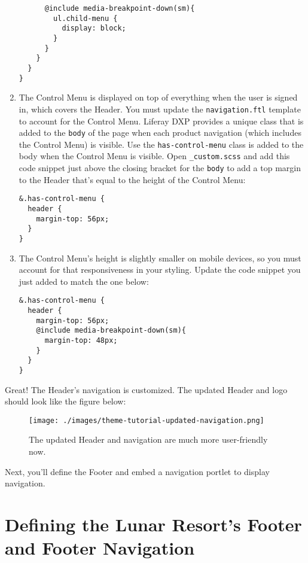 \begin{enumerate}
\begin{verbatim}
      @include media-breakpoint-down(sm){
        ul.child-menu {
          display: block;
        }
      }    
    }
  }
}
\end{verbatim}
\item
  The Control Menu is displayed on top of everything when the user is
  signed in, which covers the Header. You must update the
  \texttt{navigation.ftl} template to account for the Control Menu.
  Liferay DXP provides a unique class that is added to the \texttt{body}
  of the page when each product navigation (which includes the Control
  Menu) is visible. Use the \texttt{has-control-menu} class is added to
  the body when the Control Menu is visible. Open \texttt{\_custom.scss}
  and add this code snippet just above the closing bracket for the
  \texttt{body} to add a top margin to the Header that's equal to the
  height of the Control Menu:

\begin{verbatim}
&.has-control-menu {
  header {
    margin-top: 56px;  
  }
}
\end{verbatim}
\item
  The Control Menu's height is slightly smaller on mobile devices, so
  you must account for that responsiveness in your styling. Update the
  code snippet you just added to match the one below:

\begin{verbatim}
&.has-control-menu {
  header {
    margin-top: 56px;
    @include media-breakpoint-down(sm){
      margin-top: 48px;
    }  
  }
}
\end{verbatim}
\end{enumerate}

Great! The Header's navigation is customized. The updated Header and
logo should look like the figure below:

\begin{figure}
\centering
\texttt{[image: ./images/theme-tutorial-updated-navigation.png]}
\caption{The updated Header and navigation are much more user-friendly
now.}
\end{figure}

Next, you'll define the Footer and embed a navigation portlet to display
navigation.

\chapter{Defining the Lunar Resort's Footer and Footer
Navigation}\label{defining-the-lunar-resorts-footer-and-footer-navigation}

